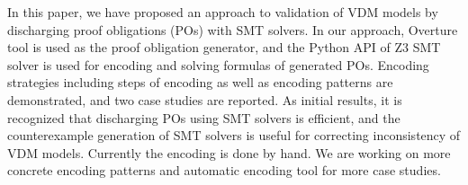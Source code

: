 In this paper, we have proposed an approach to validation of VDM models by discharging proof obligations (POs) with SMT solvers. In our approach, Overture tool is used as the proof obligation generator, and the Python API of Z3 SMT solver is used for encoding and solving formulas of generated POs. Encoding strategies including steps of encoding as well as encoding patterns are demonstrated, and two case studies are reported. As initial results, it is recognized that discharging POs using SMT solvers is efficient, and the counterexample generation of SMT solvers is useful for correcting inconsistency of VDM models. Currently the encoding is done by hand. We are working on more concrete encoding patterns and automatic encoding tool for more case studies.
